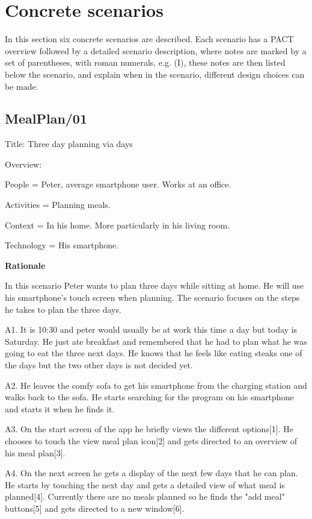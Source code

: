 \section{Concrete scenarios}
In this section six concrete scenarios are described. Each scenario has a PACT overview followed by a detailed scenario description, where notes are marked by a set of parentheses, with roman numerals, e.g. (I), these notes are then listed below the scenario, and explain when in the scenario, different design choices can be made.

\subsection{MealPlan/01} \label{MealPlan01}

Title: Three day planning via days

Overview: 

	People = Peter, average smartphone user. Works at an office.
	
	Activities = Planning meals.
	
	Context = In his home. More particularly in his living room.
	
	Technology = His smartphone.
	
\textbf{Rationale}

In this scenario Peter wants to plan three days while sitting at home. He will use his smartphone's touch screen when planning. The scenario focuses on the steps he takes to plan the three days.
	
	A1. It is 10:30 and peter would usually be at work this time a day but today is Saturday. He just ate breakfast and remembered that he had to plan what he was going to eat the three next days. He knows that he feels like eating steaks one of the days but the two other days is not decided yet.
	
	A2. He leaves the comfy sofa to get his smartphone from the charging station and walks back to the sofa. He starts searching for the program on his smartphone and starts it when he finds it.
	
	A3. On the start screen of the app he briefly views the different options[1]. He chooses to touch the view meal plan icon[2] and gets directed to an overview of his meal plan[3]. 
	
	A4. On the next screen he gets a display of the next few days that he can plan. He starts by touching the next day and gets a detailed view of what meal is planned[4]. Currently there are no meals planned so he finds the "add meal" buttons[5] and gets directed to a new window[6]. 
	
